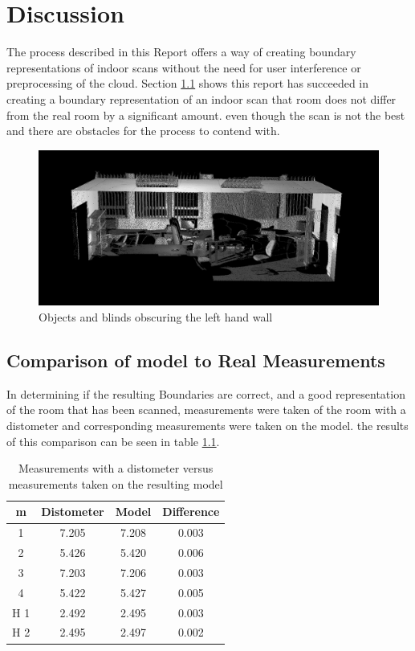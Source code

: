 \chapter{Discussion}
	\label{discussion}
	The process described in this Report offers a way of creating boundary representations of indoor scans without the need for user interference or preprocessing of the cloud. Section \ref{Comparison} shows this report has succeeded in creating a boundary representation of an indoor scan that room does not differ from the real room by a significant amount. even though the scan is not the best and there are obstacles for the process to contend with. 
	
	\begin{figure}[H]
	\centering
	\includegraphics[width=0.9\linewidth]{"Includes/images/Results/Messy Wall"}
	\caption{Objects and blinds obscuring the left hand wall}
	\label{fig:MessyWall}
	\end{figure}
	
	
	\section{Comparison of model to Real Measurements}
		\label{Comparison}
		In determining if the resulting Boundaries are correct, and a good representation of the room that has been scanned, measurements were taken of the room with a distometer and corresponding measurements were taken on the model. the results of this comparison can be seen in table \ref{MeasurmensTable}. 
		
		\begin{table}[H]
			\centering
			\begin{tabular}{|c|c c c|}
				\hline m & Distometer & Model & Difference \\ 
				\hline 1 & 7.205 & 7.208 & 0.003 \\ 
				\hline 2 & 5.426 & 5.420 & 0.006 \\ 
				\hline 3 & 7.203 & 7.206 & 0.003 \\ 
				\hline 4 & 5.422 & 5.427 & 0.005 \\ 
				\hline H 1 & 2.492 & 2.495 & 0.003 \\ 
				\hline H 2 & 2.495 & 2.497 & 0.002 \\ %
				\hline
			\end{tabular}
			\caption{Measurements with a distometer versus measurements taken on the resulting model}
			\label{MeasurmensTable}
		\end{table}
		
